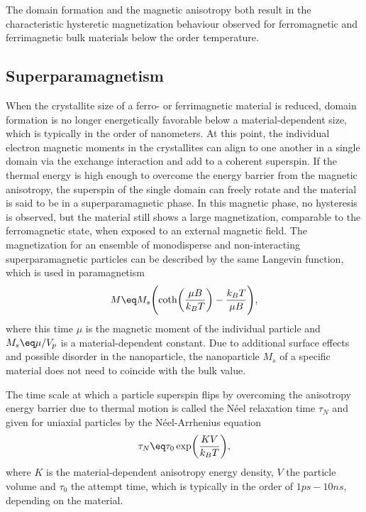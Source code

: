 \documentclass[\main/dresen_thesis.tex]{subfiles}
\begin{document}
    The domain formation and the magnetic anisotropy both result in the characteristic hysteretic magnetization behaviour observed for ferromagnetic and ferrimagnetic bulk materials below the order temperature.

  \subsection{Superparamagnetism}
    When the crystallite size of a ferro- or ferrimagnetic material is reduced, domain formation is no longer energetically favorable below a material-dependent size, which is typically in the order of nanometers.
    At this point, the individual electron magnetic moments in the crystallites can align to one another in a single domain via the exchange interaction and add to a coherent superspin.
    If the thermal energy is high enough to overcome the energy barrier from the magnetic anisotropy, the superspin of the single domain can freely rotate and the material is said to be in a superparamagnetic phase.
    In this magnetic phase, no hysteresis is observed, but the material still shows a large magnetization, comparable to the ferromagnetic state, when exposed to an external magnetic field.
    The magnetization for an ensemble of monodisperse and non-interacting superparamagnetic particles can be described by the same Langevin function, which is used in paramagnetism
    \begin{align}
      M \eq M_s \Biggl( \coth \biggl(\frac{\mu B}{k_B T} \biggr) - \frac{k_B T}{\mu B} \Biggr),
    \end{align}
    where this time $\mu$ is the magnetic moment of the individual particle and $M_s \eq \mu / V_p$ is a material-dependent constant.
    Due to additional surface effects and possible disorder in the nanoparticle, the nanoparticle $M_s$ of a specific material does not need to coincide with the bulk value.

    The time scale at which a particle superspin flips by overcoming the anisotropy energy barrier due to thermal motion is called the N\'eel relaxation time $\tau_N$ and given for uniaxial particles by the N\'eel-Arrhenius equation
    \begin{align}
      \tau_N \eq \tau_0 \exp \biggl( \frac{KV}{k_B T} \biggr),
    \end{align}
    where $K$ is the material-dependent anisotropy energy density, $V$ the particle volume and $\tau_0$ the attempt time, which is typically in the order of $1 \unit{ps} - 10 \unit{ns}$, depending on the material.
\end{document}

